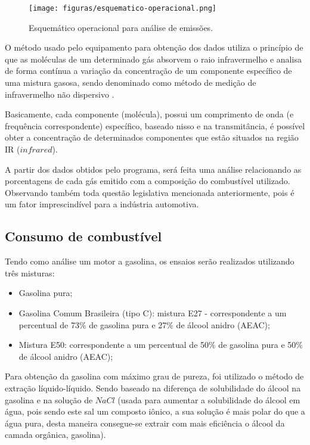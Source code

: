 \begin{figure}[h!]
	\centering
	\texttt{[image: figuras/esquematico-operacional.png]}
	\caption{Esquemático operacional para análise de emissões.}
	\label{esquematico-operacional}
\end{figure}

O método usado pelo equipamento para obtenção dos dados utiliza o princípio de que as moléculas de um determinado gás absorvem o raio infravermelho e analisa de forma contínua a variação da concentração de um componente específico de uma mistura gasosa, sendo denominado como método de medição de infravermelho não dispersivo \cite{nereu}.

Basicamente, cada componente (molécula), possui um comprimento de onda (e frequência correspondente) específico, baseado nisso e na transmitância, é possível obter a concentração de determinados componentes que estão situados na região IR ($infrared$).

A partir dos dados obtidos pelo programa, será feita uma análise relacionando as porcentagens de cada gás emitido com a composição do combustível utilizado. Observando também toda questão legislativa mencionada anteriormente, pois é um fator imprescindível para a indústria automotiva.

\subsection{Consumo de combustível}

Tendo como análise um motor a gasolina, os ensaios serão realizados utilizando três misturas:

\begin{itemize}
\item Gasolina pura;
\item Gasolina Comum Brasileira (tipo C): mistura E27 - correspondente a um percentual de 73\% de gasolina pura e 27\% de álcool anidro (AEAC);
\item Mistura E50: correspondente a um percentual de 50\% de gasolina pura e 50\% de álcool anidro (AEAC);
\end{itemize}

Para obtenção da gasolina com máximo grau de pureza, foi utilizado o método de extração líquido-líquido. Sendo baseado na diferença de solubilidade do álcool na gasolina e na solução de $NaCl$ (usada para aumentar a solubilidade do álcool em água, pois sendo este sal um composto iônico, a sua solução é mais polar do que a água pura, desta maneira consegue-se extrair com mais eficiência o álcool da camada orgânica, gasolina).

